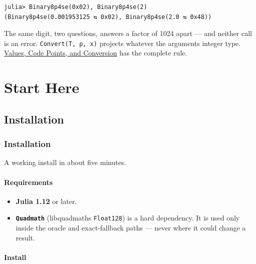 \begin{verbatim}
julia> Binary8p4se(0x02), Binary8p4se(2)
(Binary8p4se(0.001953125 ⇆ 0x02), Binary8p4se(2.0 ⇆ 0x48))
\end{verbatim}



The same digit, two questions, answers a factor of 1024 apart — and neither call is an error. \texttt{Convert(T, ρ, x)} projects whatever the argument{\textquotesingle}s integer type. \href{concept\_\allowbreak{}values\_\allowbreak{}codepoints.md}{Values, Code Points, and Conversion} has the complete rule.



\part{Start Here}


\chapter{Installation}


\section{Installation}



\label{16848947351613073531}{}


A working install in about five minutes.



\subsection{Requirements}



\label{13919788711114092546}{}


\begin{itemize}
\item \textbf{Julia 1.12} or later.


\item \textbf{\texttt{Quadmath}} (libquadmath{\textquotesingle}s \texttt{Float128}) is a hard dependency. It is used only inside the oracle and exact-fallback paths — never where it could change a result.

\end{itemize}


\subsection{Install}



